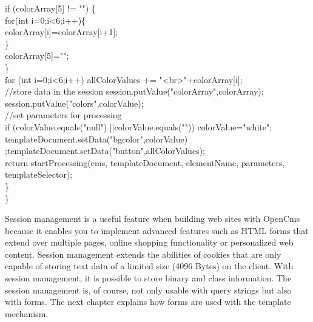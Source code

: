 \begin{java}
\jtabc        if (colorArray[5] != "") \{\\
\jtabd                for(int i=0;i<6;i++)\{\\
\jtabe                        colorArray[i]=colorArray[i+1];\\
\jtabd                \}\\
\jtabd                colorArray[5]="";\\
\jtabc        \}\\
\jtabc        for (int i=0;i<6;i++) allColorValues += "<br>"+colorArray[i];\\
\jtabc        //store data in the session session.putValue("colorArray",colorArray);\\
\jtabd                session.putValue("colors",colorValue);\\
\jtabc        //set parameters for processing\\
\jtabc        if (colorValue.equals("null") ||colorValue.equals("")) colorValue="white";\\
\jtabc        templateDocument.setData("bgcolor",colorValue)
\jtabc        ;templateDocument.setData("button",allColorValues);\\
\jtabc        return startProcessing(cms, templateDocument, elementName,
\jtabc        parameters, templateSelector);\\
\jtabc        \}\\
\}\\
\end{java}

Session management is a useful feature when building web sites with
OpenCms because it enables you to implement advanced features such as
HTML forms that extend over multiple pages, online shopping functionality
or personalized web content. Session management extends the abilities of
cookies that are only capable of storing text data of a limited size
(4096 Bytes) on the client. With session management, it is possible to
store binary and class information. The session management is, of course,
not only usable with query strings but also with forms. The next chapter
explains how forms are used with the template mechanism.

